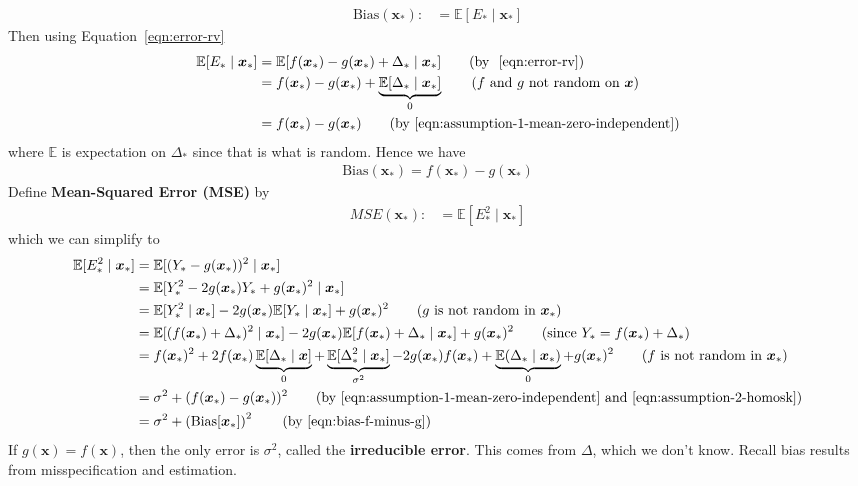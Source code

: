 \documentclass[12pt, a4paper]{article}
\theoremstyle{definition}
\begin{document}
	\begin{align}
		\text{Bias}(\bm{x}_*):
		&= \mathbb{E}[E_* \mid \bm{x}_*]
		\label{eqn:def-bias}
	\end{align}
	Then using Equation~\ref{eqn:error-rv}
	\begin{align*}
		\mathbb{E}[E_* \mid \bm{x}_*]
		& = \mathbb{E}[f(\bm{x}_*) - g(\bm{x}_*) + \Delta_* \mid \bm{x}_*]
		\tag{by ~\ref{eqn:error-rv}}\\
		& = f(\bm{x}_*) - g(\bm{x}_*) + \underbrace{\mathbb{E}[\Delta_* \mid \bm{x}_*]}_{0}
		\tag{$f$ and $g$ not random on $\bm{x}$}\\
		& = f(\bm{x}_*) - g(\bm{x}_*)
		\tag{by \ref{eqn:assumption-1-mean-zero-independent}}
	\end{align*}
	where $\mathbb{E}$ is expectation on $\Delta_*$ since that is what is random.
	Hence we have
	\begin{align}
		\text{Bias}(\bm{x}_*) = f(\bm{x}_*) - g(\bm{x}_*)
		\label{eqn:bias-f-minus-g}
	\end{align}
	Define \textbf{Mean-Squared Error (MSE)} by
	\begin{align}
		MSE(\bm{x}_*):
		&= \mathbb{E}[E_*^2 \mid \bm{x}_*]\label{eqn:-def-MSE}
	\end{align}
	which we can simplify to
	\begin{align*}
		\mathbb{E}[E_*^2 \mid \bm{x}_*]
		&=\mathbb{E}[(Y_* - g(\bm{x}_*))^2 \mid \bm{x}_*]\\
		&= \mathbb{E}[Y_*^2 - 2g(\bm{x}_*)Y_* + g(\bm{x}_*)^2 \mid \bm{x}_*]\\
		&= \mathbb{E}[Y_*^2 \mid \bm{x}_*] -2g(\bm{x}_*) \mathbb{E}[Y_* \mid \bm{x}_*] + g(\bm{x}_*)^2
		\tag{$g$ is not random in $\bm{x}_*$}\\
		&= \mathbb{E}[(f(\bm{x}_*) + \Delta_*)^2 \mid \bm{x}_*]
		- 2g(\bm{x}_*)\mathbb{E}[f(\bm{x}_*) + \Delta_* \mid \bm{x}_*] + g(\bm{x}_*)^2
		\tag{since $Y_* = f(\bm{x}_*) + \Delta_*$}\\
		&=  f(\bm{x}_*)^2 + 2 f(\bm{x}_*) \underbrace{\mathbb{E}[\Delta_* \mid \bm{x}]}_{0} +\underbrace{\mathbb{E}[\Delta_*^2 \mid \bm{x}_*]}_{\sigma^2}
		-2g(\bm{x}_*)f(\bm{x}_*) + \underbrace{\mathbb{E}(\Delta_* \mid \bm{x}_*)}_{0} + g(\bm{x}_*)^2
		\tag{$f$ is not random in $\bm{x}_*$}\\
		&=\sigma^2 + (f(\bm{x}_*) - g(\bm{x}_*))^2
		\tag{by \ref{eqn:assumption-1-mean-zero-independent} and \ref{eqn:assumption-2-homosk}}\\
		&=\sigma^2 +\left( \text{Bias}[\bm{x}_*]\right)^2
		\tag{by \ref{eqn:bias-f-minus-g}}
	\end{align*}
	If $g(\bm{x}) = f(\bm{x})$, then the only error is $\sigma^2$, called the
	\textbf{irreducible error}. This comes from $\Delta$, which we don't know.
	Recall bias results from misspecification and estimation.
\end{document}
